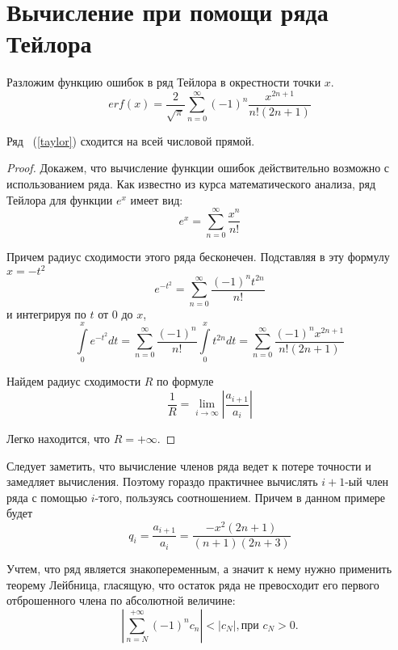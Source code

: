 \section{Вычисление при помощи ряда Тейлора} Разложим функцию ошибок в ряд Тейлора в окрестности точки $x$.
\begin{equation}
	\label{taylor}
	erf(x) = \frac{2}{\sqrt{\pi}}\sum^{\infty}_{n = 0}(-1)^n \frac{x^{2n+1}}{n!(2n+1)}
\end{equation}
\begin{theorem}
	Ряд ~(\ref{taylor}) сходится на всей числовой прямой.
\end{theorem}
\begin{proof}
	Докажем, что вычисление функции ошибок действительно возможно с использованием ряда. Как известно из курса математического анализа, ряд Тейлора для функции $e^x$ имеет вид:
	$$
		e^x = \sum\limits_{n=0}^{\infty} \frac{x^n}{n!}
	$$
	
	Причем радиус сходимости этого ряда бесконечен. Подставляя в эту формулу $x = -t^2$
	$$
		e^{-t^2} = \sum\limits_{n=0}^{\infty} \frac{(-1)^nt^{2n}}{n!}
	$$
	и интегрируя по $t$ от $0$ до $x$,
	$$
		\int\limits_{0}^{x} e^{-t^2} dt= \sum\limits_{n=0}^{\infty} \frac{(-1)^n}{n!}\int\limits_{0}^{x} t^{2n} dt = \sum\limits_{n=0}^{\infty} \frac{(-1)^nx^{2n+1}}{n!(2n+1)}
	$$
	
	Найдем радиус сходимости $R$ по формуле
	$$
		\frac{1}{R} = \lim\limits_{i \to \infty} \left| \frac{a_{i+1}}{a_i} \right|
	$$
	
	Легко находится, что $R = +\infty$.
\end{proof}

Следует заметить, что вычисление членов ряда ведет к потере точности и замедляет вычисления. Поэтому гораздо практичнее вычислять $i+1$-ый член ряда с помощью $i$-того, пользуясь соотношением. Причем в данном примере будет
$$
	q_i = \frac{a_{i+1}}{a_i} = \frac{-x^2(2n+1)}{(n+1)(2n+3)}
$$

Учтем, что ряд является знакопеременным, а значит к нему нужно применить теорему  Лейбница, гласящую, что остаток ряда не превосходит его первого отброшенного члена по абсолютной величине:
$$
	\left| \sum\limits_{n=N}^{+\infty} (-1)^nc_n \right| < \left| c_N \right|, \textit{при } c_N > 0.
$$
